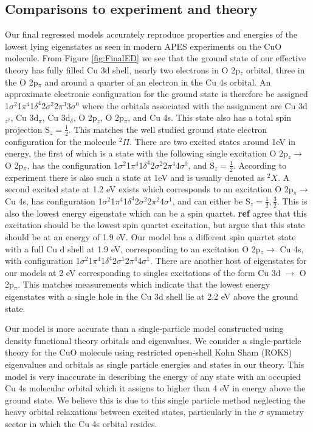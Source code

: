 \documentclass{article}
\begin{document}
\subsection{Comparisons to experiment and theory}
Our final regressed models accurately reproduce properties and energies of the lowest lying eigenstates as seen in modern APES experiments on the CuO molecule.
From Figure \ref{fig:FinalED} we see that the ground state of our effective theory has fully filled Cu 3d shell, nearly two electrons in O 2p$_z$ orbital, three in the O 2p$_\pi$ and around a quarter of an electron in the Cu 4s orbital.
An approximate electronic configuration for the ground state is therefore
be assigned 1$\sigma^2$1$\pi^4$1$\delta^4$2$\sigma^2$2$\pi^3$3$\sigma^0$ where the orbitals associated with the assignment are Cu 3d$_{z^2}$, Cu 3d$_\pi$, Cu 3d$_\delta$, O 2p$_z$, O 2p$_\pi$, and Cu 4s.
This state also has a total spin projection S$_z = \frac{1}{2}$.
This matches the well studied ground state electron configuration for the molecule $^2\Pi$.
There are two excited states around 1eV in energy, the first of which is a state with the following single excitation O 2p$_z \rightarrow$ O 2p$_\pi$, has the configuration 1$\sigma^2$1$\pi^4$1$\delta^4$2$\sigma^2$2$\pi^4$4$\sigma^0$, and S$_z = \frac{1}{2}$.
According to experiment there is also such a state at 1eV and is usually denoted as $^2X$.
A second excited state at 1.2 eV exists which corresponds to an excitation 
O 2p$_\pi \rightarrow$ Cu 4s, has configuration 1$\sigma^2$1$\pi^4$1$\delta^4$2$\sigma^2$2$\pi^2$4$\sigma^1$, and can either be S$_z = \frac{1}{2}, \frac{3}{2}$. 
This is also the lowest energy eigenstate which can be a spin quartet.
\textbf{ref} agree that this excitation should be the lowest spin quartet excitation, but argue that this state should be at an energy of 1.9 eV. 
Our model has a different spin quartet state with a full Cu d shell at 1.9 eV, corresponding to an excitation O 2p$_z \rightarrow$ Cu 4s, with configuration 1$\sigma^2$1$\pi^4$1$\delta^4$2$\sigma^1$2$\pi^4$4$\sigma^1$. 
There are another host of eigenstates for our models at 2 eV corresponding to singles excitations of the form Cu 3d $\rightarrow$ O 2p$_\pi$. 
This matches measurements which indicate that the lowest energy eigenstates with a single hole in the Cu 3d shell lie at 2.2 eV above the ground state.

Our model is more accurate than a single-particle model constructed using
density functional theory orbitals and eigenvalues. 
We consider a single-particle theory for the CuO molecule using restricted open-shell Kohn Sham (ROKS) eigenvalues and orbitals as single particle energies and states in our theory. 
This model is very inaccurate in describing the energy of any state with an occupied Cu 4s molecular orbital which it assigns to higher than 4 eV in energy above the ground state.
We believe this is due to this single particle method neglecting the heavy orbital relaxations between excited states, particularly in the $\sigma$ symmetry sector in which the Cu 4s orbital resides.
\end{document}
